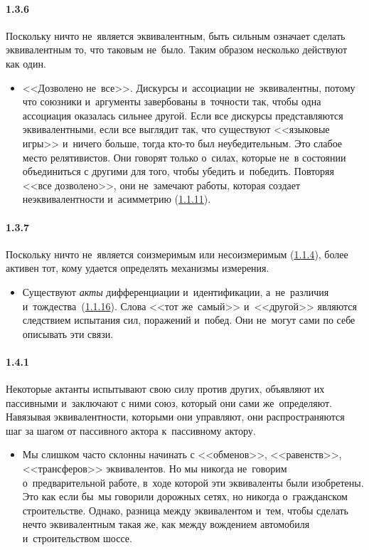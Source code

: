 \paragraph{1.3.6}\hypertarget{par:1.3.6}{} Поскольку ничто не~является эквивалентным, быть сильным означает сделать эквивалентным то, что таковым не~было. Таким образом несколько действуют как один.
	\begin{itemize}
	\item <<Дозволено не~все>>. Дискурсы и~ассоциации не~эквивалентны, потому что союзники и~аргументы завербованы в~точности так, чтобы одна ассоциация оказалась сильнее другой. Если все дискурсы представляются эквивалентными, если все выглядит так, что существуют <<языковые игры>> и~ничего больше, тогда кто-то был неубедительным. Это слабое место релятивистов. Они говорят только о~силах, которые не~в состоянии объединиться с другими для того, чтобы убедить и~победить. Повторяя <<все дозволено>>, они не~замечают работы, которая создает неэквивалентности и~асимметрию (\hyperlink{par:1.1.11}{1.1.11}).
	\end{itemize}

\paragraph{1.3.7}\hypertarget{par:1.3.7}{} Поскольку ничто не~является соизмеримым или несоизмеримым (\hyperlink{par:1.1.4}{1.1.4}), более активен тот, кому удается определять механизмы измерения.
	\begin{itemize}
	\item Существуют {\itshape акты} дифференциации и~идентификации, а~не~различия и~тождества~(\hyperlink{par:1.1.16}{1.1.16}). Слова <<тот же~самый>> и~<<другой>> являются следствием испытания сил, поражений и~побед. Они не~могут сами по себе описывать эти связи.
	\end{itemize}


\paragraph{1.4.1}\hypertarget{par:1.4.1}{} Некоторые актанты испытывают свою силу против других, объявляют их пассивными и~заключают с ними союз, который они сами же~определяют. Навязывая эквивалентности, которыми они управляют, они распространяются шаг за шагом от пассивного актора к~пассивному актору.
	\begin{itemize}
	\item Мы слишком часто склонны начинать с <<обменов>>, <<равенств>>, <<трансферов>> эквивалентов. Но мы никогда не~говорим о~предварительной работе, в~ходе которой эти эквиваленты были изобретены. Это как если бы~мы говорили дорожных сетях, но никогда о~гражданском строительстве. Однако, разница между эквивалентом и~тем, чтобы сделать нечто эквивалентным такая же, как между вождением автомобиля и~строительством шоссе.
	\end{itemize}

